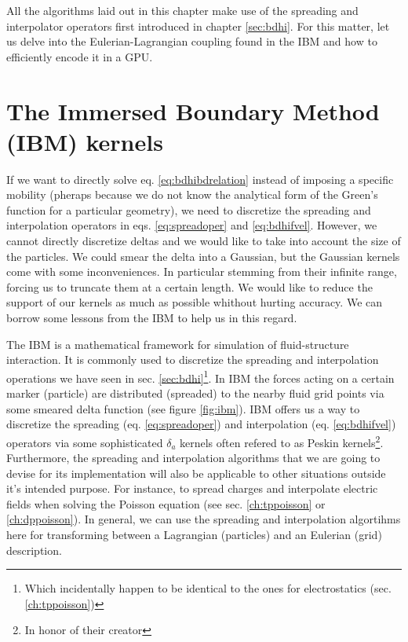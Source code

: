 \documentclass[ twoside,openright,titlepage,numbers=noenddot,%
headinclude,footinclude,cleardoublepage=empty,abstract=on,
BCOR=5mm,paper=a4,fontsize=11pt, dvipsnames
]{scrreprt}
\newcommand{\gpu}{\gls{GPU}\xspace}
\begin{document}
All the algorithms laid out in this chapter make use of the spreading and interpolator operators first introduced in chapter \ref{sec:bdhi}. For this matter, let us delve into the Eulerian-Lagrangian coupling found in the \gls{IBM} and how to efficiently encode it in a \gpu.

\chapter{The Immersed Boundary Method (IBM) kernels}\label{sec:ibm}
If we want to directly solve eq. \eqref{eq:bdhibdrelation} instead of imposing a specific mobility (pheraps because we do not know the analytical form of the Green's function for a particular geometry), we need to discretize the spreading and interpolation operators in eqs. \eqref{eq:spreadoper} and \eqref{eq:bdhifvel}. However, we cannot directly discretize deltas and we would like to take into account the size of the particles. We could smear the delta into a Gaussian, but the Gaussian kernels come with some inconveniences. In particular stemming from their infinite range, forcing us to truncate them at a certain length. We would like to reduce the support of our kernels as much as possible whithout hurting accuracy. We can borrow some lessons from the \gls{IBM} to help us in this regard.

The \gls{IBM}\cite{Peskin1977}\cite{Peskin2002} is a mathematical framework for simulation of fluid-structure interaction. It is commonly used to discretize the spreading and interpolation operations we have seen in sec. \ref{sec:bdhi}\footnote{Which incidentally happen to be identical to the ones for electrostatics (sec. \ref{ch:tppoisson})}. In \gls{IBM} the forces acting on a certain marker (particle) are distributed (spreaded) to the nearby fluid grid points via some smeared delta function (see figure \ref{fig:ibm}). \gls{IBM} offers us a way to discretize the spreading (eq. \eqref{eq:spreadoper}) and interpolation (eq. \eqref{eq:bdhifvel}) operators via some sophisticated $\delta_a$ kernels often refered to as Peskin kernels\footnote{In honor of their creator\cite{Peskin1977}}.
Furthermore, the spreading and interpolation algorithms that we are going to devise for its implementation will also be applicable to other situations outside it's intended purpose. For instance, to spread charges and interpolate electric fields when solving the Poisson equation (see sec. \ref{ch:tppoisson} or \ref{ch:dppoisson}). In general, we can use the spreading and interpolation algortihms here for transforming between a Lagrangian (particles) and an Eulerian (grid) description.
\end{document}
